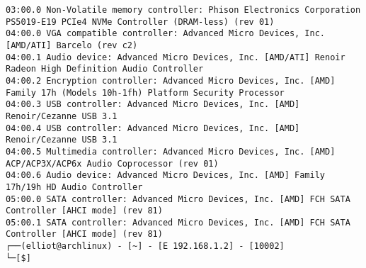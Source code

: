 \begin{lstlisting}[caption={Sample Code}, label={lst:sample}]
03:00.0 Non-Volatile memory controller: Phison Electronics Corporation PS5019-E19 PCIe4 NVMe Controller (DRAM-less) (rev 01)
04:00.0 VGA compatible controller: Advanced Micro Devices, Inc. [AMD/ATI] Barcelo (rev c2)
04:00.1 Audio device: Advanced Micro Devices, Inc. [AMD/ATI] Renoir Radeon High Definition Audio Controller
04:00.2 Encryption controller: Advanced Micro Devices, Inc. [AMD] Family 17h (Models 10h-1fh) Platform Security Processor
04:00.3 USB controller: Advanced Micro Devices, Inc. [AMD] Renoir/Cezanne USB 3.1
04:00.4 USB controller: Advanced Micro Devices, Inc. [AMD] Renoir/Cezanne USB 3.1
04:00.5 Multimedia controller: Advanced Micro Devices, Inc. [AMD] ACP/ACP3X/ACP6x Audio Coprocessor (rev 01)
04:00.6 Audio device: Advanced Micro Devices, Inc. [AMD] Family 17h/19h HD Audio Controller
05:00.0 SATA controller: Advanced Micro Devices, Inc. [AMD] FCH SATA Controller [AHCI mode] (rev 81)
05:00.1 SATA controller: Advanced Micro Devices, Inc. [AMD] FCH SATA Controller [AHCI mode] (rev 81)
┌──(elliot@archlinux) - [~] - [E 192.168.1.2] - [10002]
└─[$]
\end{lstlisting}
